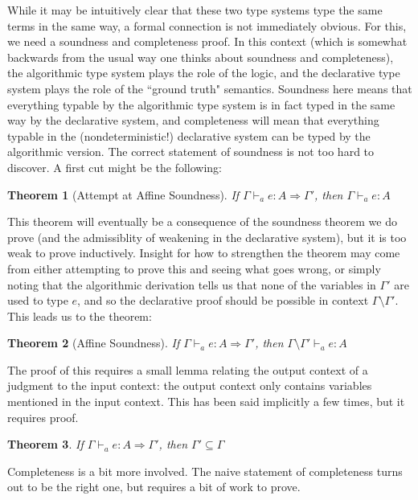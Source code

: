 \documentclass{article}
\newtheorem{theorem}{Theorem}
\theoremstyle{definition}
\newcommand{\gens}{\Rightarrow}
\begin{document}
While it may be intuitively clear that these two type systems type the same terms in the same way, a formal connection is not immediately obvious. For this, we need a soundness and completeness proof. In this context (which is somewhat backwards from the usual way one thinks about soundness and completeness), the algorithmic type system plays the role of the logic, and the declarative type system plays the role of the ``ground truth" semantics. Soundness here means that everything typable by the algorithmic type system is in fact typed in the same way by the declarative system, and completeness will mean that everything typable in the (nondeterministic!) declarative system can be typed by the algorithmic version. The correct statement of soundness is not too hard to discover. A first cut might be the following:

\begin{theorem}[Attempt at Affine Soundness]
If $\Gamma \vdash_a e : A \gens \Gamma'$, then $\Gamma \vdash_a e : A$
\end{theorem}

This theorem will eventually be a consequence of the soundness theorem we do prove (and the admissiblity of weakening in the declarative system), but it is too weak to prove inductively. Insight for how to strengthen the theorem may come from either attempting to prove this and seeing what goes wrong, or simply noting that the algorithmic derivation tells us that none of the variables in $\Gamma'$ are used to type $e$, and so the declarative proof should be possible in context $\Gamma \setminus \Gamma'$. This leads us to the theorem:

\begin{theorem}[Affine Soundness]
If $\Gamma \vdash_a e : A \gens \Gamma'$, then $\Gamma \setminus \Gamma' \vdash_a e : A$
\end{theorem}

The proof of this requires a small lemma relating the output context of a judgment to the input context: the output context only contains variables mentioned in the input context. This has been said implicitly a few times, but it requires proof.

\begin{theorem}
If $\Gamma \vdash_a e : A \gens \Gamma'$, then $\Gamma' \subseteq \Gamma$
\end{theorem}

Completeness is a bit more involved. The naive statement of completeness turns out to be the right one, but requires a bit of work to prove.
\end{document}
